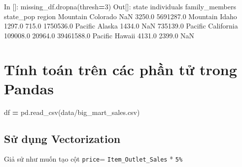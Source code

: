 \documentclass[
]{book}
\newenvironment{Shaded}{\begin{snugshade}}{\end{snugshade}}
\newcommand{\DecValTok}[1]{\textcolor[rgb]{0.00,0.00,0.81}{#1}}
\newcommand{\FloatTok}[1]{\textcolor[rgb]{0.00,0.00,0.81}{#1}}
\newcommand{\NormalTok}[1]{#1}
\newcommand{\OperatorTok}[1]{\textcolor[rgb]{0.81,0.36,0.00}{\textbf{#1}}}
\newcommand{\StringTok}[1]{\textcolor[rgb]{0.31,0.60,0.02}{#1}}
\begin{document}
\begin{Shaded}
\begin{Highlighting}[]
\NormalTok{In []: missing\_df.dropna(thresh}\OperatorTok{=}\DecValTok{3}\NormalTok{)}
\NormalTok{Out[]: }
\NormalTok{               state  individuals  family\_members   state\_pop}
\NormalTok{region                                                       }
\NormalTok{Mountain    Colorado          NaN          }\FloatTok{3250.0}   \FloatTok{5691287.0}
\NormalTok{Mountain       Idaho       }\FloatTok{1297.0}           \FloatTok{715.0}   \FloatTok{1750536.0}
\NormalTok{Pacific       Alaska       }\FloatTok{1434.0}\NormalTok{             NaN    }\FloatTok{735139.0}
\NormalTok{Pacific   California     }\FloatTok{109008.0}         \FloatTok{20964.0}  \FloatTok{39461588.0}
\NormalTok{Pacific       Hawaii       }\FloatTok{4131.0}          \FloatTok{2399.0}\NormalTok{         NaN}
\end{Highlighting}
\end{Shaded}

\chapter{Tính toán trên các phần tử trong Pandas}\label{tuxednh-touxe1n-truxean-cuxe1c-phux1ea7n-tux1eed-trong-pandas}

\begin{Shaded}
\begin{Highlighting}[]
\NormalTok{df }\OperatorTok{=}\NormalTok{ pd.read\_csv(}\StringTok{\textquotesingle{}data/big\_mart\_sales.csv\textquotesingle{}}\NormalTok{)}
\end{Highlighting}
\end{Shaded}

\section{Sử dụng Vectorization}\label{sux1eed-dux1ee5ng-vectorization}

Giả sử như muốn tạo cột \texttt{price}= \texttt{Item\_Outlet\_Sales} * \texttt{5\%}
\end{document}
